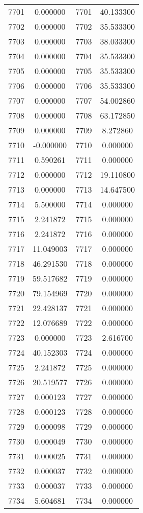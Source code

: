 \documentclass[12pt]{article}
\begin{document}
\begin{longtable}{@{}cccc@{}}
7701 & 0.000000 & 7701 & 40.133300 \\
7702 & 0.000000 & 7702 & 35.533300 \\
7703 & 0.000000 & 7703 & 38.033300 \\
7704 & 0.000000 & 7704 & 35.533300 \\
7705 & 0.000000 & 7705 & 35.533300 \\
7706 & 0.000000 & 7706 & 35.533300 \\
7707 & 0.000000 & 7707 & 54.002860 \\
7708 & 0.000000 & 7708 & 63.172850 \\
7709 & 0.000000 & 7709 & 8.272860 \\
7710 & -0.000000 & 7710 & 0.000000 \\
7711 & 0.590261 & 7711 & 0.000000 \\
7712 & 0.000000 & 7712 & 19.110800 \\
7713 & 0.000000 & 7713 & 14.647500 \\
7714 & 5.500000 & 7714 & 0.000000 \\
7715 & 2.241872 & 7715 & 0.000000 \\
7716 & 2.241872 & 7716 & 0.000000 \\
7717 & 11.049003 & 7717 & 0.000000 \\
7718 & 46.291530 & 7718 & 0.000000 \\
7719 & 59.517682 & 7719 & 0.000000 \\
7720 & 79.154969 & 7720 & 0.000000 \\
7721 & 22.428137 & 7721 & 0.000000 \\
7722 & 12.076689 & 7722 & 0.000000 \\
7723 & 0.000000 & 7723 & 2.616700 \\
7724 & 40.152303 & 7724 & 0.000000 \\
7725 & 2.241872 & 7725 & 0.000000 \\
7726 & 20.519577 & 7726 & 0.000000 \\
7727 & 0.000123 & 7727 & 0.000000 \\
7728 & 0.000123 & 7728 & 0.000000 \\
7729 & 0.000098 & 7729 & 0.000000 \\
7730 & 0.000049 & 7730 & 0.000000 \\
7731 & 0.000025 & 7731 & 0.000000 \\
7732 & 0.000037 & 7732 & 0.000000 \\
7733 & 0.000037 & 7733 & 0.000000 \\
7734 & 5.604681 & 7734 & 0.000000 \\

\end{longtable}
\end{document}
